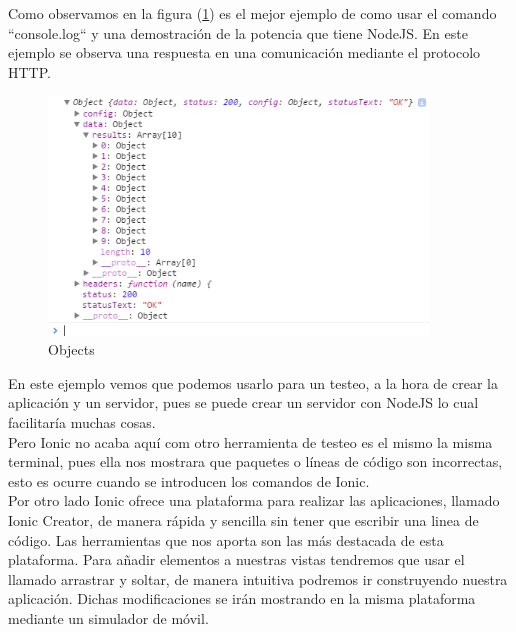 \documentclass[a4paper, 11pt]{article}
\begin{document}
\begin{itemize}
              Como observamos en la figura (\ref{f:object}) es el mejor ejemplo
              de como usar el comando ``console.log`` y una demostración de la
              potencia que tiene NodeJS. En este ejemplo se observa una respuesta
              en una comunicación mediante el protocolo HTTP.\\

              \begin{figure}[H]
                \centering
                     \includegraphics[width=0.9\textwidth]{objects}
                     \caption{Objects}
                     \label{f:object}
               \end{figure}

              En este ejemplo vemos que podemos usarlo para un testeo, a la hora
              de crear la aplicación y un servidor, pues se puede crear un servidor
              con NodeJS lo cual facilitaría muchas cosas.\\

              Pero Ionic no acaba aquí com otro herramienta de testeo es el mismo
              la misma terminal, pues ella nos mostrara que paquetes o líneas de
              código son incorrectas, esto es ocurre cuando se introducen los
              comandos de Ionic.\\

              Por otro lado Ionic ofrece una plataforma para realizar las
              aplicaciones, llamado Ionic Creator, de manera rápida y sencilla
              sin tener que escribir una linea de código. Las herramientas que
              nos aporta son las más destacada de esta plataforma. Para añadir
              elementos a nuestras vistas tendremos que usar el llamado
              arrastrar y soltar, de manera intuitiva podremos ir construyendo
              nuestra aplicación. Dichas modificaciones se irán mostrando en la
              misma plataforma mediante un simulador de móvil.\\


\end{itemize}
\end{document}
